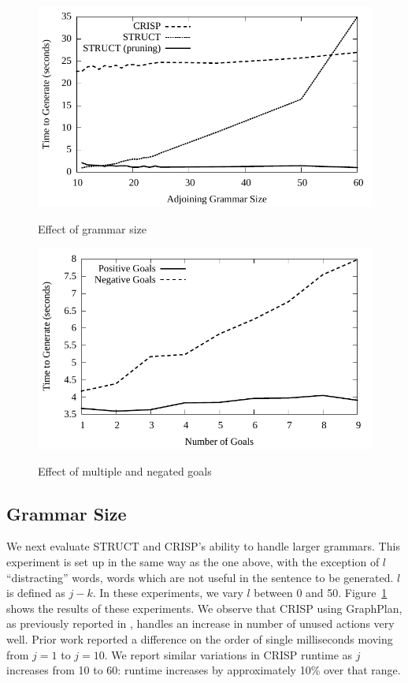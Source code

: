 \begin{figure}
\centering
\includegraphics[width=0.7 \linewidth]{../analysis/plots/large-grammar/large-grammar.pdf}
\label{graph-large-grammars}
\caption{Effect of grammar size}
\end{figure}

\begin{figure}
\centering
\includegraphics[width=0.7 \linewidth]{../analysis/plots/goals/differentgoals.pdf}
\label{chart-different-goals}
\caption{Effect of multiple and negated goals}
\end{figure}

\subsection{Grammar Size}
We next evaluate STRUCT and CRISP's ability to
handle larger grammars. This experiment is set up in the same way as
the one above, with the exception of $l$ ``distracting'' words, words
which are not useful in the sentence to be generated.  $l$ is defined
as $j - k$.  In these experiments, we vary $l$ between 0 and 50.
Figure~\ref{graph-large-grammars} shows the results of these
experiments.  We observe that CRISP using GraphPlan, as previously
reported in \cite{koller_experiences_2011}, handles an increase in
number of unused actions very well.  Prior work reported a difference
on the order of single milliseconds moving from $j = 1$ to $j = 10$.
We report similar variations in CRISP runtime as $j$ increases from 10
to 60: runtime increases by approximately 10\% over that range.

